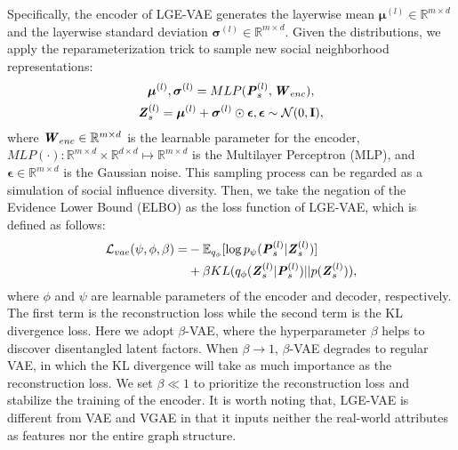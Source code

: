 \documentclass[letterpaper]{article} %
\begin{document}
Specifically, the encoder of LGE-VAE generates the layerwise mean $\boldsymbol{\mu}^{(l)} \in \mathbb{R}^{m\times d}$ and the layerwise standard deviation $\boldsymbol{\sigma}^{(l)} \in \mathbb{R}^{m\times d}$. Given the distributions, we apply the reparameterization trick to sample new social neighborhood representations:
\begin{gather}
    \boldsymbol{\mu}^{(l)}, \boldsymbol{\sigma}^{(l)} = MLP(\textbf{\textit{P}}_{s}^{(l)}, \textbf{\textit{W}}_{enc}),\\
    \textbf{\textit{Z}}_s^{(l)} = \boldsymbol{\mu}^{(l)}+\boldsymbol{\sigma}^{(l)}\odot\boldsymbol{\epsilon}, \boldsymbol{\epsilon} \sim \mathcal{N}(0,\textbf{I}),
\end{gather}
where $\textbf{\textit{W}}_{enc} \in \mathbb{R}^{m\times d}$ is the learnable parameter for the encoder, $MLP(\cdot): \mathbb{R}^{m\times d}\times \mathbb{R}^{d\times d} \mapsto \mathbb{R}^{m\times d}$ is the Multilayer Perceptron (MLP), and $\boldsymbol{\epsilon} \in \mathbb{R}^{m\times d}$ is the Gaussian noise. This sampling process can be regarded as a simulation of social influence diversity. Then, we take the negation of the Evidence Lower Bound (ELBO) as the loss function of LGE-VAE, which is defined as follows:
\begin{equation}
    \begin{split}
        \mathcal{L}_{vae}(\psi,\phi,\beta)=
        &-\mathbb{E}_{q_\phi}[\log p_{\psi}(\textbf{\textit{P}}_s^{(l)}|\textbf{\textit{Z}}_s^{(l)})]\\
        &+\beta KL (q_{\phi}(\textbf{\textit{Z}}_s^{(l)} | \textbf{\textit{P}}_s^{(l)}) || p(\textbf{\textit{Z}}_s^{(l)})),
    \end{split}
\end{equation}
where $\phi$ and $\psi$ are learnable parameters of the encoder and decoder, respectively. The first term is the reconstruction loss while the second term is the KL divergence loss. Here we adopt $\beta$-VAE, where the hyperparameter $\beta$ helps to discover disentangled latent factors. When $\beta \rightarrow 1$, $\beta$-VAE degrades to regular VAE, in which the KL divergence will take as much importance as the reconstruction loss. We set $\beta \ll 1$ to prioritize the reconstruction loss and stabilize the training of the encoder. It is worth noting that, LGE-VAE is different from VAE and VGAE in that it inputs neither the real-world attributes as features nor the entire graph structure.
\end{document}
